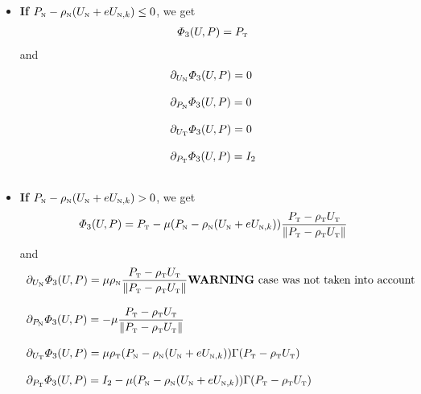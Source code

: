 \begin{itemize}
\begin{itemize}
\item  \textbf{If} $P_{{\hbox{\tiny{N}}}} - \rho_{{\hbox{\tiny{N}}}} (U_{{\hbox{\tiny{N}}}} +e  U_{{\hbox{\tiny{N}}},k}) \leq 0$, we get 
  \begin{equation}
  \label{eq:AC-TT5}
  \begin{array}{l}
  \varPhi_3(U,P) =   P_{\t}
\end{array}
\end{equation}
and 
 \begin{equation}
   \label{eq:AC-TT6}
   \begin{array}{l}
     \partial_{U_{\n}} \varPhi_3(U,P) =  0 \\ \\
     \partial_{P_{\n}} \varPhi_3(U,P) =  0 \\ \\ 
     \partial_{U_{\t}} \varPhi_3(U,P) =  0 \\ \\
     \partial_{P_{\t}} \varPhi_3(U,P) =  I_2 \\ \\ 
   \end{array}
 \end{equation}
\item  \textbf{If} $P_{{\hbox{\tiny{N}}}} - \rho_{{\hbox{\tiny{N}}}} (U_{{\hbox{\tiny{N}}}} +e  U_{{\hbox{\tiny{N}}},k}) > 0$, we get 
\begin{equation}
  \label{eq:AC-TT7}
  \begin{array}{l}
  \varPhi_3(U,P) =  P_{\t} - \mu (P_{\n} - \rho_{\n} (U_{\n} +e  U_{\n,k}) )  \Frac{P_{\t} - \rho_{\t} U_{\t} }{ \| P_{\t} - \rho_{\t} U_{\t}\| }
\end{array}
\end{equation}
and 
 \begin{equation}
   \label{eq:AC-TT8}
   \begin{array}{l}
     \partial_{U_{\n}} \varPhi_3(U,P) =  \mu \rho_{\n}  \Frac{P_{\t} - \rho_{\t} U_{\t} }{ \| P_{\t} - \rho_{\t} U_{\t}\| }\text{{\bf WARNING} case was not taken into account}\\ \\
     \partial_{P_{\n}} \varPhi_3(U,P) =  -\mu  \Frac{P_{\t} - \rho_{\t} U_{\t} }{ \| P_{\t} - \rho_{\t} U_{\t}\| } \\ \\ 
     \partial_{U_{\t}} \varPhi_3(U,P) =  \mu\rho_{\t}(P_{\n} - \rho_{\n} (U_{\n} +e  U_{\n,k}) ) \Gamma(P_{\t} - \rho_{\t} U_{\t})  \\ \\
     \partial_{P_{\t}} \varPhi_3(U,P) =  I_2-\mu(P_{\n} - \rho_{\n} (U_{\n} +e  U_{\n,k}) ) \Gamma(P_{\t} - \rho_{\t} U_{\t})  \\ \\ 
   \end{array}
 \end{equation}
\end{itemize}



\end{itemize}

